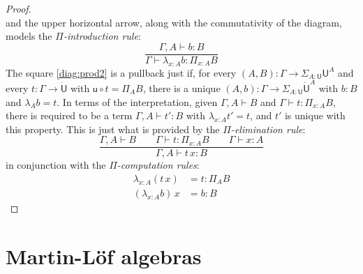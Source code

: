 \documentclass[12pt,reqno]{amsart}
\renewcommand{\to}{\ensuremath{\rightarrow}}
\newcommand{\G}{\ensuremath{\Gamma}}
\newcommand{\ext}[2]{{#1,#2}}
\renewcommand{\t}{\ensuremath{\mathsf{u}}}
\newcommand{\T}{\ensuremath{\mathsf{U}}}
\newcommand{\TT}{\ensuremath{\dot{\mathsf{U}}}}
\theoremstyle{remark}
\theoremstyle{definition}
\begin{document}
\begin{proof}
\[\]
and the upper horizontal arrow, along with the commutativity of the diagram, models the \emph{$\Pi$-introduction rule}:
\[
\frac{\ext{\G}{A}\vdash b:B}{\G\vdash \lambda_{x:A} b : \Pi_{x:A} B}
\]
The square \eqref{diag:prod2} is a pullback just if, for every $(A,B) : \G \to \Sigma_{A:\T}\T^A$ and every $t: \G \to \TT$ with $\t \circ t = \Pi_A B$, there is a unique $(A,b) : \G \to \Sigma_{A:\T}\TT^A$ with $b:B$ and $\lambda_A b = t$.  In terms of the interpretation, given $\ext{\G}{A} \vdash B$ and $\G\vdash t: \Pi_{x:A} B$, there is required to be a term $\ext{\G}{A}\vdash t':B$ with $\lambda_{x:A}  t' = t$, and $t'$ is unique with this property.  This is just what is provided by the \emph{$\Pi$-elimination rule}:
\[
\frac{{\ext{\G}{A} \vdash B}\qquad {\G \vdash t : \Pi_{x:A}  B} \qquad {\G \vdash x:A}}{{\ext{\G}{A}\vdash t\, x :B}}
\]
in conjunction with the \emph{$\Pi$-computation rules}:
\begin{align*}
\lambda_{x:A} (t\,x) &= t : \Pi_A B\\
(\lambda_{x:A} b)\,x &= b : B
\end{align*}
\end{proof}


\section{Martin-L\"of algebras}\label{sec:MLalgebras}
\end{document}

